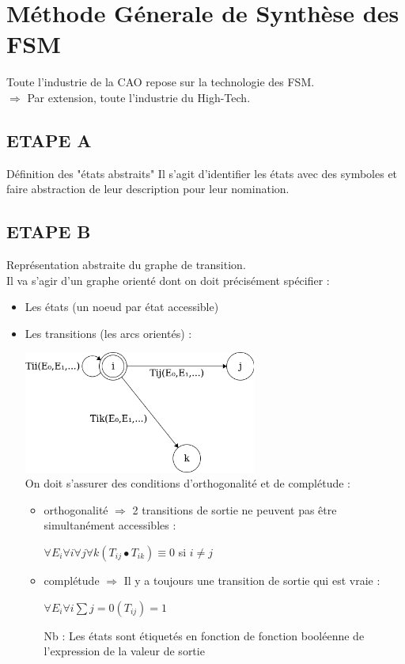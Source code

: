 \documentclass[10pt]{article}
\begin{document}
\section{Méthode Génerale de Synthèse des FSM}
Toute l'industrie de la CAO repose sur la technologie des FSM. \\
$\Rightarrow$ Par extension, toute l'industrie du High-Tech.

\subsection{ETAPE A}
Définition des "états abstraits"
Il s'agit d'identifier les états avec des symboles et faire abstraction de leur
description pour leur nomination.

\subsection{ETAPE B}
Représentation abstraite du graphe de transition.\\
Il va s'agir d'un graphe orienté dont on doit précisément spécifier :
\begin{itemize}
  \item Les états (un noeud par état accessible)
  \item Les transitions (les arcs orientés) :
  \begin{center}
    \includegraphics[height=4cm]{./pics/graph1.png}
    \\On doit s'assurer des conditions d'orthogonalité et de complétude :
    \begin{itemize}
      \item orthogonalité $\Rightarrow$ 2 transitions de sortie ne peuvent pas
      être simultanément accessibles :\\
      \begin{center}
        \(\forall E_i \forall i \forall j \forall k{(T_{ij} \bullet T_{ik})} \equiv 0\) si
        $i \ne j$
      \end{center}
      \item complétude $\Rightarrow$ Il y a toujours une transition de sortie
      qui est vraie : \\
      \begin{center}
        \(\forall E_i \forall i \sum{j=0}{(T_{ij})} = 1\)
      \end{center}
      Nb : Les états sont étiquetés en fonction de fonction booléenne de l'expression
      de la valeur de sortie
    \end{itemize}
  \end{center}
\end{itemize}
\end{document}
